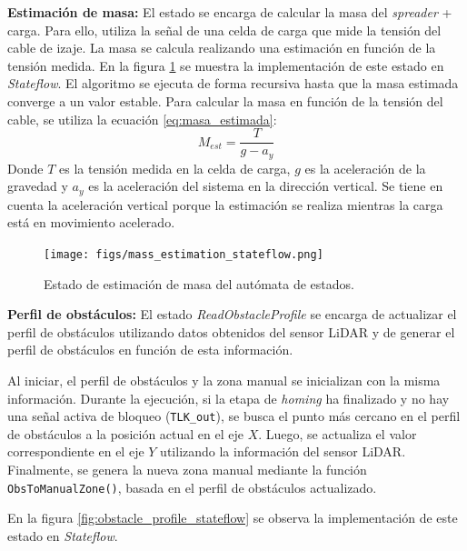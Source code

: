 \documentclass{article}
\begin{document}
        \textbf{Estimación de masa:}
            El estado se encarga de calcular la masa del \textit{spreader} + carga. Para ello, utiliza la señal de una celda de carga que mide la tensión del cable de izaje. La masa se calcula realizando una estimación en función de la tensión medida. En la figura \ref{fig:mass_estimation_stateflow} se muestra la implementación de este estado en \textit{Stateflow}. 
            El algoritmo se ejecuta de forma recursiva hasta que la masa estimada converge a un valor estable. Para calcular la masa en función de la tensión del cable, se utiliza la ecuación \ref{eq:masa_estimada}:
            \begin{equation} \label{eq:masa_estimada}
                M_{est} = \frac{T}{g - a_{y}}
            \end{equation}
            Donde \(T\) es la tensión medida en la celda de carga, \(g\) es la aceleración de la gravedad y \(a_{y}\) es la aceleración del sistema en la dirección vertical. Se tiene en cuenta la aceleración vertical porque la estimación se realiza mientras la carga está en movimiento acelerado.

            \begin{figure} [H]
                \centering
                \texttt{[image: figs/mass\_estimation\_stateflow.png]}
                \caption{Estado de estimación de masa del autómata de estados.}
                \label{fig:mass_estimation_stateflow}
            \end{figure}

        \textbf{Perfil de obstáculos:}
            El estado \textit{ReadObstacleProfile} se encarga de actualizar el perfil de obstáculos utilizando datos obtenidos del sensor LiDAR y de generar el perfil de obstáculos en función de esta información. 

            Al iniciar, el perfil de obstáculos y la zona manual se inicializan con la misma información. Durante la ejecución, si la etapa de \textit{homing} ha finalizado y no hay una señal activa de bloqueo (\texttt{TLK\_out}), se busca el punto más cercano en el perfil de obstáculos a la posición actual en el eje \(X\). Luego, se actualiza el valor correspondiente en el eje \(Y\) utilizando la información del sensor LiDAR. Finalmente, se genera la nueva zona manual mediante la función \texttt{ObsToManualZone()}, basada en el perfil de obstáculos actualizado.

            En la figura \ref{fig:obstacle_profile_stateflow} se observa la implementación de este estado en \textit{Stateflow}.
\end{document}
